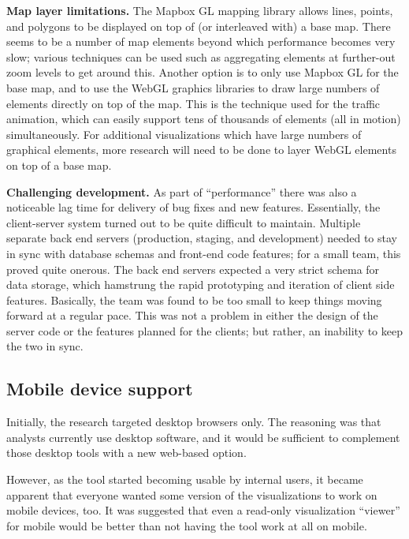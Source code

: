 \textbf{Map layer limitations.} The Mapbox GL mapping library allows lines, points, and polygons to be displayed on top of (or interleaved with) a base map. There seems to be a number of map elements beyond which performance becomes very slow; various techniques can be used such as aggregating elements at further-out zoom levels to get around this. Another option is to only use Mapbox GL for the base map, and to use the WebGL graphics libraries to draw large numbers of elements directly on top of the map. This is the technique used for the traffic animation, which can easily support tens of thousands of elements (all in motion) simultaneously. For additional visualizations which have large numbers of graphical elements, more research will need to be done to layer WebGL elements on top of a base map.

\textbf{Challenging development.} As part of ``performance'' there was also a noticeable lag time for delivery of bug fixes and new features. Essentially, the client-server system turned out to be quite difficult to maintain. Multiple separate back end servers (production, staging, and development) needed to stay in sync with database schemas and front-end code features; for a small team, this proved quite onerous. The back end servers expected a very strict schema for data storage, which hamstrung the rapid prototyping and iteration of client side features. Basically, the team was found to be too small to keep things moving forward at a regular pace. This was not a problem in either the design of the server code or the features planned for the clients; but rather, an inability to keep the two in sync.

\hypertarget{mathub-mobile-device-support}{%
\subsection{Mobile device support}\label{mobile-device-support}}

Initially, the research targeted desktop browsers only. The reasoning was that analysts currently use desktop software, and it would be sufficient to complement those desktop tools with a new web-based option.

However, as the tool started becoming usable by internal users, it became apparent that everyone wanted some version of the visualizations to work on mobile devices, too. It was suggested that even a read-only visualization ``viewer'' for mobile would be better than not having the tool work at all on mobile.

